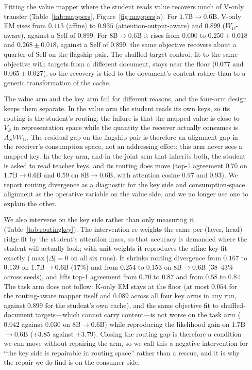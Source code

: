 \documentclass[11pt]{article}
\begin{document}
Fitting the value mapper where the student reads value recovers much of V-only
transfer (Table~\ref{tab:mappers}, Figure~\ref{fig:mappers}a). For
$1.7$B$\to0.6$B, V-only EM rises from $0.113$ (affine) to $0.935$
(attention-output-aware) and $0.899$ ($W_O$-aware), against a Self of $0.899$.
For $8$B$\to0.6$B it rises from $0.000$ to $0.250 \pm 0.018$ and
$0.268 \pm 0.018$, against a Self of $0.899$: the same objective recovers about a
quarter of Self on the flagship pair. The
shuffled-target control, fit to the same objective with targets from a different
document, stays near the floor ($0.077$ and $0.065 \pm 0.027$), so the recovery
is tied to the document's content rather than to a generic transformation of the
cache.

The value arm and the key arm fail for different reasons, and the four-arm design
keeps them separate. In the value arm the student reads its own keys, so its
routing is the student's routing: the failure is that the mapped value is close
to $V_S$ in representation space while the quantity the receiver actually
consumes is $A_S V W_O$. The residual gap on the flagship pair is therefore an
alignment gap in the receiver's consumption space, not an addressing effect:
this arm never sees a mapped key. In the key arm, and in the joint arm that
inherits both, the student is asked to read teacher keys, and its routing does
move (top-1 agreement $0.70$ on $1.7$B$\to0.6$B and $0.59$ on
$8$B$\to0.6$B, with attention cosine $0.97$ and $0.93$). We report routing
divergence as a diagnostic for the key side and consumption-space alignment as
the operative variable on the value side, and we no longer use one to explain the
other.

We also intervene on the key side rather than only measuring it
(Table~\ref{tab:routingkey}). The intervention re-weights the same per-(layer,
head) ridge fit by the student's attention mass, so that accuracy is demanded
where the student will actually look; with unit weights it reproduces the affine
key fit exactly ($\max|\Delta| = 0$ on all six runs). It shrinks routing
divergence from $0.167$ to $0.139$ on $1.7$B$\to0.6$B ($17\%$) and from $0.254$
to $0.153$ on $8$B$\to0.6$B ($38$--$43\%$ across seeds), and lifts top-1
agreement from $0.70$ to $0.87$ and from $0.58$ to $0.84$. The task arm does not
follow: K-only EM stays at the floor (at most $0.054$ for the routing-aware
mapper itself and $0.089$ across all four key arms in any run, against $0.899$
for the student's own cache), and the same objective fit to shuffled-document
targets---which cannot carry content---is not worse on the task arm ($0.042$
against $0.030$ on $8$B$\to0.6$B) while reproducing the likelihood gain on
$1.7$B$\to0.6$B ($+3.85$ against $+3.79$). Closing the routing gap is therefore a
condition we can move without repairing the arm, so we call this a negative
intervention for ``the key side is repairable in routing space'' rather than a
rescue, and it is why the repair we do find is on the consumer side.
\end{document}
